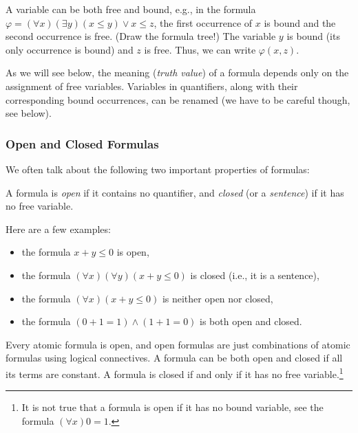 \begin{example}
    A variable can be both free and bound, e.g., in the formula $\varphi=(\forall x)(\exists y)(x\leq y)\lor x\leq z$, the first occurrence of $x$ is bound and the second occurrence is free. (Draw the formula tree!) The variable $y$ is bound (its only occurrence is bound) and $z$ is free. Thus, we can write $\varphi(x,z)$.
\end{example}

\begin{remark}
    As we will see below, the meaning (\emph{truth value}) of a formula depends only on the assignment of free variables. Variables in quantifiers, along with their corresponding bound occurrences, can be renamed (we have to be careful though, see below).
\end{remark}


\subsubsection{Open and Closed Formulas}

We often talk about the following two important properties of formulas:

\begin{definition}
A formula is \emph{open} if it contains no quantifier, and \emph{closed} (or a \emph{sentence}) if it has no free variable.
\end{definition}

\begin{example} Here are a few examples:
    \begin{itemize}
        \item the formula $x+y\leq 0$ is open,
        \item the formula $(\forall x)(\forall y)(x+y\leq 0)$ is closed (i.e., it is a sentence),
        \item the formula $(\forall x)(x+y\leq 0)$ is neither open nor closed,
        \item the formula $(0+1=1)\land (1+1=0)$ is both open and closed.
    \end{itemize}
\end{example}

Every atomic formula is open, and open formulas are just combinations of atomic formulas using logical connectives. A formula can be both open and closed if all its terms are constant. A formula is closed if and only if it has no free variable.\footnote{It is not true that a formula is open if it has no bound variable, see the formula $(\forall x)0=1$.}

